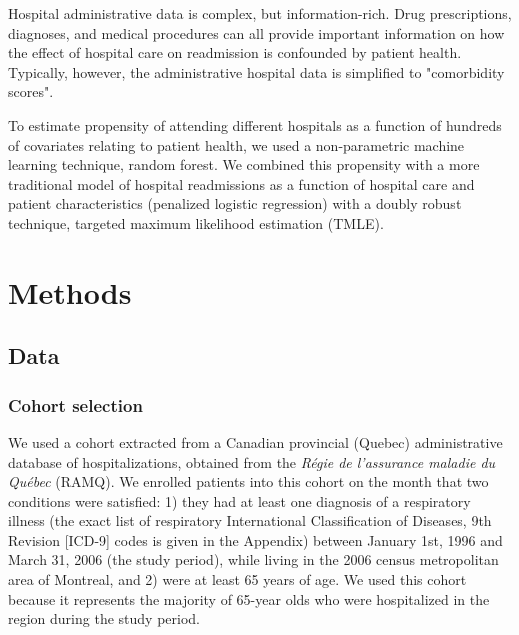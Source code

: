 \documentclass[]{article}\usepackage[]{graphicx}\usepackage[]{color}
\begin{document}
Hospital administrative data is complex, but information-rich. Drug prescriptions, diagnoses, and medical procedures can all provide important information on how the effect of hospital care on readmission is confounded by patient health. Typically, however, the administrative hospital data is simplified to "comorbidity scores". 

To estimate propensity of attending different hospitals as a function of hundreds of covariates relating to patient health, we used a non-parametric machine learning technique, random forest. We combined this propensity with a more traditional model of hospital readmissions as a function of hospital care and patient characteristics (penalized logistic regression) with a doubly robust technique, targeted maximum likelihood estimation (TMLE).





\section{Methods}

\subsection{Data}

\subsubsection{Cohort selection}
We used a cohort extracted from a Canadian provincial (Quebec) administrative database of hospitalizations, obtained from the \emph{Régie de l'assurance maladie du Québec} (RAMQ). We enrolled patients into this cohort on the month that two conditions were satisfied: 1) they had at least one diagnosis of a respiratory illness (the exact list of respiratory International Classification of Diseases, 9th Revision [ICD-9] codes is given in the Appendix) between January 1st, 1996 and March 31, 2006 (the study period), while living in the 2006 census metropolitan area of Montreal, and 2) were at least 65 years of age. We used this cohort because it represents the majority of 65-year olds who were hospitalized in the region during the study period. 
\end{document}
